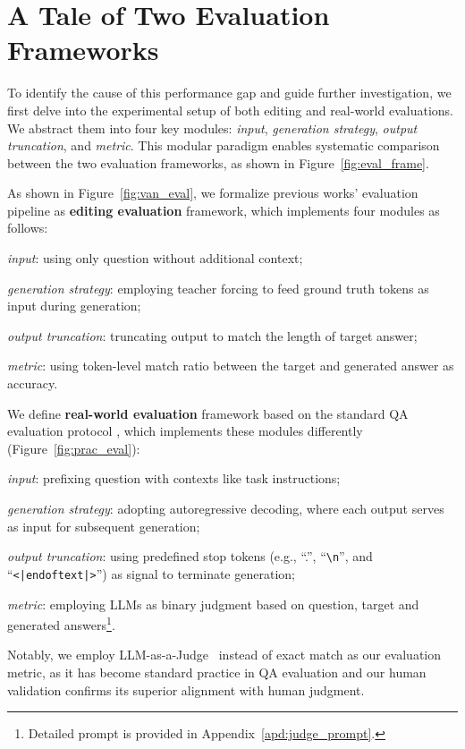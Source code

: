 
\section{A Tale of Two Evaluation Frameworks}
\label{sec:eval}

    



To identify the cause of this performance gap and guide further investigation, we first delve into the experimental setup of both editing and real-world evaluations.
We abstract them into four key modules: \textit{input}, \textit{generation strategy}, \textit{output truncation}, and \textit{metric}.
This modular paradigm enables systematic comparison between the two evaluation frameworks, as shown in Figure~\ref{fig:eval_frame}.

As shown in Figure~\ref{fig:van_eval}, we formalize previous works' evaluation pipeline \cite{yao-etal-2023-editing, wang2024wise} as \textbf{editing evaluation} framework, which implements four modules as follows:
\begin{enumerate*}[label=\roman*)]
    \item \textit{input}: using only question without additional context;
    \item \textit{generation strategy}: employing teacher forcing to feed ground truth tokens as input during generation;
    \item \textit{output truncation}: truncating output to match the length of target answer;
    \item \textit{metric}: using token-level match ratio between the target and generated answer as accuracy.
\end{enumerate*}


We define \textbf{real-world evaluation} framework based on the standard QA evaluation protocol \cite{eval-harness}, which implements these modules differently (Figure~\ref{fig:prac_eval}):
\begin{enumerate*}[label=\roman*)]
    \item \textit{input}: prefixing question with contexts like task instructions;
    \item \textit{generation strategy}: adopting autoregressive decoding, where each output serves as input for subsequent generation;
    \item \textit{output truncation}: using predefined stop tokens (e.g., ``.'', ``\texttt{\textbackslash{}n}'', and ``\texttt{<|endoftext|>}'') as signal to terminate generation;
    \item \textit{metric}: employing LLMs as binary judgment based on question, target and generated answers\footnote{Detailed prompt is provided in Appendix~\ref{apd:judge_prompt}.}.
\end{enumerate*}
Notably, we employ LLM-as-a-Judge~\cite{li2024llmasjudge} instead of exact match as our evaluation metric, as it has become standard practice in QA evaluation and our human validation confirms its superior alignment with human judgment.


